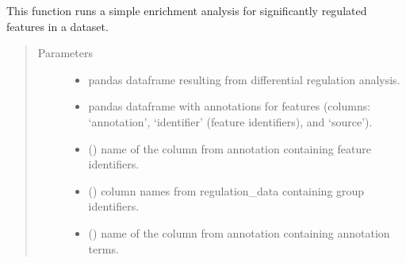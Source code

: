 \documentclass[letterpaper,10pt,english]{sphinxmanual}
\begin{document}
\begin{fulllineitems}
\label{\detokenize{_autosummary/analytics_core.analytics:analytics_core.analytics.analytics.run_regulation_enrichment}}
This function runs a simple enrichment analysis for significantly regulated features in a dataset.
\begin{quote}\begin{description}
\item[{Parameters}] \leavevmode\begin{itemize}
\item {} 
 \textendash{} pandas dataframe resulting from differential regulation analysis.

\item {} 
 \textendash{} pandas dataframe with annotations for features (columns: ‘annotation’, ‘identifier’ (feature identifiers), and ‘source’).

\item {} 
 () \textendash{} name of the column from annotation containing feature identifiers.

\item {} 
 () \textendash{} column names from regulation\_data containing group identifiers.

\item {} 
 () \textendash{} name of the column from annotation containing annotation terms.


\end{itemize}
\end{description}
\end{quote}
\end{fulllineitems}
\end{document}
